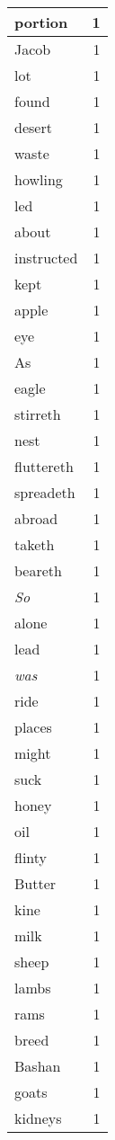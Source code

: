 \begin{center}
\begin{longtable}{l|r}
portion & 1 \\ \hline
Jacob & 1 \\ \hline
lot & 1 \\ \hline
found & 1 \\ \hline
desert & 1 \\ \hline
waste & 1 \\ \hline
howling & 1 \\ \hline
led & 1 \\ \hline
about & 1 \\ \hline
instructed & 1 \\ \hline
kept & 1 \\ \hline
apple & 1 \\ \hline
eye & 1 \\ \hline
As & 1 \\ \hline
eagle & 1 \\ \hline
stirreth & 1 \\ \hline
nest & 1 \\ \hline
fluttereth & 1 \\ \hline
spreadeth & 1 \\ \hline
abroad & 1 \\ \hline
taketh & 1 \\ \hline
beareth & 1 \\ \hline
\emph{So} & 1 \\ \hline
alone & 1 \\ \hline
lead & 1 \\ \hline
\emph{was} & 1 \\ \hline
ride & 1 \\ \hline
places & 1 \\ \hline
might & 1 \\ \hline
suck & 1 \\ \hline
honey & 1 \\ \hline
oil & 1 \\ \hline
flinty & 1 \\ \hline
Butter & 1 \\ \hline
kine & 1 \\ \hline
milk & 1 \\ \hline
sheep & 1 \\ \hline
lambs & 1 \\ \hline
rams & 1 \\ \hline
breed & 1 \\ \hline
Bashan & 1 \\ \hline
goats & 1 \\ \hline
kidneys & 1 \\ \hline

\end{longtable}
\end{center}
